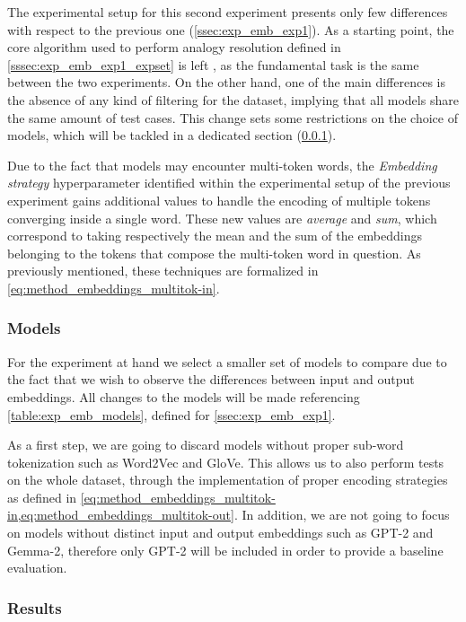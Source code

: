 The experimental setup for this second experiment presents only few differences with respect to the previous one (\cref{ssec:exp_emb_exp1}).
As a starting point, the core algorithm used to perform analogy resolution defined in \cref{sssec:exp_emb_exp1_expset} is left , as the fundamental task is the same between the two experiments.
On the other hand, one of the main differences is the absence of any kind of filtering for the dataset, implying that all models share the same amount of test cases.
This change  sets some restrictions on the choice of models, which will be tackled in a dedicated section (\cref{sssec:exp_emb_exp2_models}).

Due to the fact that models may encounter multi-token words, the \emph{Embedding strategy} hyperparameter identified within the experimental setup of the previous experiment gains additional values to handle the encoding of multiple tokens converging inside a single word.
These new values are \emph{average} and \emph{sum}, which correspond to taking respectively the mean and the sum of the embeddings belonging to the tokens that compose the multi-token word in question.
As previously mentioned, these techniques are formalized in \cref{eq:method_embeddings_multitok-in}.

\subsubsection{Models}\label{sssec:exp_emb_exp2_models}

For the experiment at hand we select a smaller set of models to compare due to the fact that we wish to observe the differences between input and output embeddings.
All changes to the models will be made referencing \cref{table:exp_emb_models}, defined for \cref{ssec:exp_emb_exp1}.

As a first step, we are going to discard models without proper sub-word tokenization such as Word2Vec and GloVe. 
This allows us to also perform tests on the whole dataset, through the implementation of proper encoding strategies as defined in \cref{eq:method_embeddings_multitok-in,eq:method_embeddings_multitok-out}.
In addition, we are not going to focus on models without distinct input and output embeddings such as GPT-2 and Gemma-2, therefore only GPT-2 will be included in order to provide a baseline evaluation.

\subsubsection{Results}

